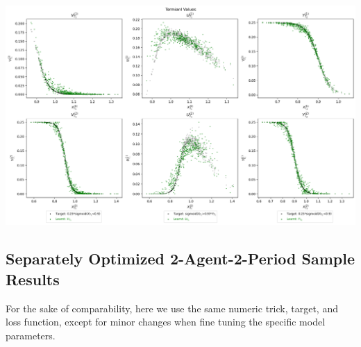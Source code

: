 \documentclass[a4paper,10pt]{article}
\newcommand{\1}{\mathbf{1}}
\begin{document}
\begin{minipage}[h]{\textwidth}
  \begin{minipage}[h]{0.8\textwidth}
    \centering
    \includegraphics{FinalReports/Illustration_diagrams/Joint-2A2P-Sigmoid-ResExamples/sigmoid_target.png}\\
    \label{fig:terminal-values-jnt}
  \end{minipage}
  \vspace{-10pt}
\end{minipage}

\newpage  %

\subsection{Separately Optimized 2-Agent-2-Period Sample Results}

For the sake of comparability, here we use the same numeric trick, target, and loss function, except for minor changes when fine tuning the specific model parameters. 
\end{document}
